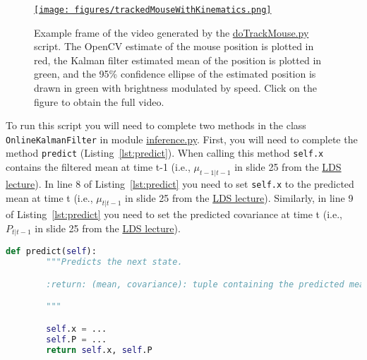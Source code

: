 \documentclass[12pt]{article}
\begin{document}
\begin{figure}
	\begin{center}
		\href{https://www.gatsby.ucl.ac.uk/~rapela/neuroinformatics/2024/worksheets/linearDynamicalSystems/videos/FrameTop_2021-06-03T17-00-00_end001000.avi}{\texttt{[image: figures/trackedMouseWithKinematics.png]}}
		\label{fig:trackedMouseWithKinematics}

        \caption{Example frame of the video generated by the
        \href{https://github.com/joacorapela/neuroinformatics24/blob/master/worksheets/07_linearDynamicalSystems/code/scripts/doTrackMouse.py}{doTrackMouse.py}
        script. The OpenCV estimate of the mouse position is plotted in red,
        the Kalman filter estimated mean of the position is plotted in green,
        and the 95\% confidence ellipse of the estimated position is drawn in
        green with brightness modulated by speed. Click on the figure to obtain
        the full video.}

	\end{center}
\end{figure}

To run this script you will need to complete two methods in the class
\texttt{OnlineKalmanFilter} in module
\href{https://github.com/joacorapela/neuroinformatics24/blob/master/worksheets/07_linearDynamicalSystems/code/src/inference.py}{inference.py}.
%
First, you will need to complete the method \texttt{predict}
(Listing~\ref{lst:predict}). When calling this method \texttt{self.x} contains
the filtered mean at time t-1 (i.e., $\mu_{t-1|t-1}$ in slide 25 from the
\href{https://github.com/joacorapela/neuroinformatics24/blob/master/lectures/07_linearDynamicalSystems/LDS_SWCNeuroinf2024.pdf}{LDS
lecture}). In line 8 of Listing~\ref{lst:predict} you need to set
\texttt{self.x} to the predicted mean at time t (i.e., $\mu_{t|t-1}$ in slide
25 from the
\href{https://github.com/joacorapela/neuroinformatics24/blob/master/lectures/07_linearDynamicalSystems/LDS_SWCNeuroinf2024.pdf}{LDS
lecture}). Similarly, in line 9 of Listing~\ref{lst:predict} you need to set
the predicted covariance at time t (i.e., $P_{t|t-1}$ in slide 25 from the
\href{https://github.com/joacorapela/neuroinformatics24/blob/master/lectures/07_linearDynamicalSystems/LDS_SWCNeuroinf2024.pdf}{LDS lecture}). 

\begin{lstlisting}[caption={method \texttt{predict} in class \texttt{OnlineKalmanFilter} in module \texttt{inference.py}},label={lst:predict},language=python]
    def predict(self):
        """Predicts the next state.

        :return: (mean, covariance): tuple containing the predicted mean and covariance matrix.

        """

        self.x = ...
        self.P = ...
        return self.x, self.P
\end{lstlisting}
\end{document}
